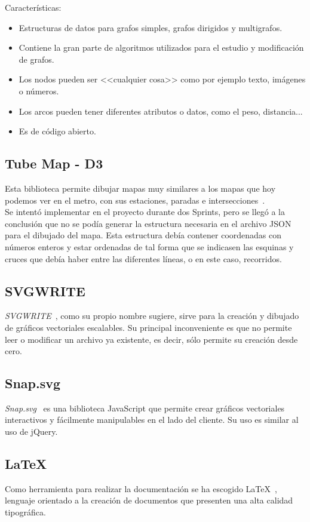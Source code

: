 \noindent Características:
\begin{itemize}
	\item Estructuras de datos para grafos simples, grafos dirigidos y multigrafos.
	\item Contiene la gran parte de algoritmos utilizados para el estudio y modificación de grafos.
	\item Los nodos pueden ser <<cualquier cosa>> como por ejemplo texto, imágenes o números.
	\item Los arcos pueden tener diferentes atributos o datos, como el peso, distancia...
	\item Es de código abierto.
\end{itemize}


\subsection{Tube Map - D3}
Esta biblioteca permite dibujar mapas muy similares a los mapas que hoy podemos ver en el metro, con sus estaciones, paradas e intersecciones~\cite{doc:tubemap}.
\\
Se intentó implementar en el proyecto durante dos Sprints, pero se llegó a la conclusión que no se podía generar la estructura necesaria en el archivo JSON para el dibujado del mapa. Esta estructura debía contener coordenadas con números enteros y estar ordenadas de tal forma que se indicasen las esquinas y cruces que debía haber entre las diferentes líneas, o en este caso, recorridos.

\subsection{SVGWRITE}\label{sub:svgwrite}
\textit{SVGWRITE}~\cite{doc:svgwritedocs}, como su propio nombre sugiere, sirve para la creación y dibujado de gráficos vectoriales escalables. Su principal inconveniente es que no permite leer o modificar un archivo ya existente, es decir, sólo permite su creación desde cero.

\subsection{Snap.svg}\label{sub:snap}
\textit{Snap.svg}~\cite{doc:snapsvg} es una biblioteca JavaScript que permite crear gráficos vectoriales interactivos y fácilmente manipulables en el lado del cliente. Su uso es similar al uso de jQuery.


\subsection{\LaTeX}
Como herramienta para realizar la documentación se ha escogido \LaTeX{}~\cite{wiki:latex}, lenguaje orientado a la creación de documentos que presenten una alta calidad tipográfica.

